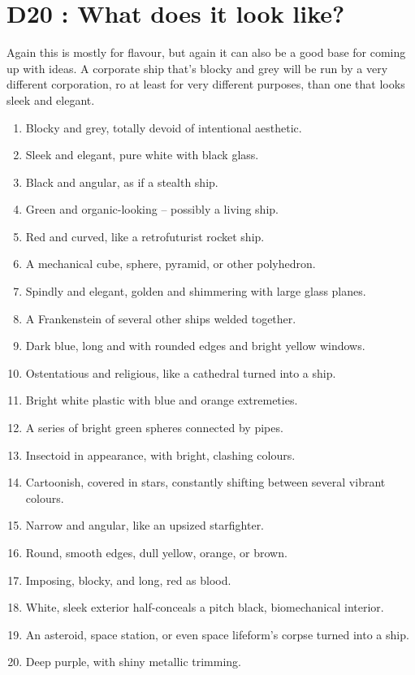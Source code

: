 \documentclass{article}
\begin{document}
\section*{D20 : What does it look like?}
Again this is mostly for flavour, but again it can also be a good base for coming up with ideas. A corporate ship that's blocky and grey will be run by a very different corporation, ro at least for very different purposes, than one that looks sleek and elegant.
\begin{enumerate}
	\item Blocky and grey, totally devoid of intentional aesthetic.
	\item Sleek and elegant, pure white with black glass.
	\item Black and angular, as if a stealth ship.
	\item Green and organic-looking – possibly a living ship.
	\item Red and curved, like a retrofuturist rocket ship.
	\item A mechanical cube, sphere, pyramid, or other polyhedron.
	\item Spindly and elegant, golden and shimmering with large glass planes.
	\item A Frankenstein of several other ships welded together.
	\item Dark blue, long and with rounded edges and bright yellow windows.
	\item Ostentatious and religious, like a cathedral turned into a ship.
	\item Bright white plastic with blue and orange extremeties.
	\item A series of bright green spheres connected by pipes.
	\item Insectoid in appearance, with bright, clashing colours.
	\item Cartoonish, covered in stars, constantly shifting between several vibrant colours.
	\item Narrow and angular, like an upsized starfighter.
	\item Round, smooth edges, dull yellow, orange, or brown.
	\item Imposing, blocky, and long, red as blood.
	\item White, sleek exterior half-conceals a pitch black, biomechanical interior.
	\item An asteroid, space station, or even space lifeform's corpse turned into a ship.
	\item Deep purple, with shiny metallic trimming.
\end{enumerate}
\end{document}
